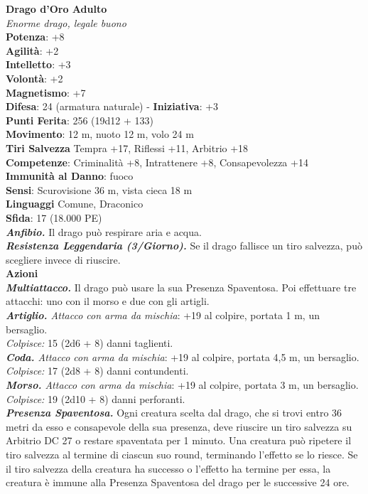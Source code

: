 \begin{multicols}{2}
\medskip\textbf{Drago d'Oro Adulto}\\
\emph{Enorme drago, legale buono}\\
\textbf{Potenza}: +8\\
\textbf{Agilità}: +2\\
\textbf{Intelletto}: +3\\
\textbf{Volontà}: +2\\
\textbf{Magnetismo}: +7\\
\textbf{Difesa}: 24 (armatura naturale) - \textbf{Iniziativa}: +3\\
\textbf{Punti Ferita}: 256 (19d12 + 133)\\
\textbf{Movimento}: 12 m, nuoto 12 m, volo 24 m\\
\textbf{Tiri Salvezza} Tempra +17, Riflessi +11, Arbitrio +18\\
\textbf{Competenze}: Criminalità +8, Intrattenere +8, Consapevolezza +14\\
\textbf{Immunità al Danno}: fuoco\\
\textbf{Sensi}: Scurovisione 36 m, vista cieca 18 m\\
\textbf{Linguaggi} Comune, Draconico\\
\textbf{Sfida}: 17 (18.000 PE)\smallskip\\
\emph{\textbf{Anfibio.}} Il drago può respirare aria e acqua.\\
\emph{\textbf{Resistenza Leggendaria (3/Giorno).}} Se il drago fallisce un tiro salvezza, può scegliere invece di riuscire.\\
\smallskip\textbf{Azioni}\\
\emph{\textbf{Multiattacco.}} Il drago può usare la sua Presenza Spaventosa. Poi effettuare tre attacchi: uno con il morso e due con gli artigli.\\
\emph{\textbf{Artiglio.} Attacco con arma da mischia}: +19 al colpire, portata 1 m, un bersaglio.\\
\emph{Colpisce:} 15 (2d6 + 8) danni taglienti.\\
\emph{\textbf{Coda.} Attacco con arma da mischia}: +19 al colpire, portata 4,5 m, un bersaglio.\\
\emph{Colpisce:} 17 (2d8 + 8) danni contundenti.\\
\emph{\textbf{Morso.} Attacco con arma da mischia}: +19 al colpire, portata 3 m, un bersaglio.\\
\emph{Colpisce:} 19 (2d10 + 8) danni perforanti.\\
\emph{\textbf{Presenza Spaventosa.}} Ogni creatura scelta dal drago, che si trovi entro 36 metri da esso e consapevole della sua presenza, deve riuscire un tiro salvezza su Arbitrio DC  27 o restare spaventata per 1 minuto. Una creatura può ripetere il tiro salvezza al termine di ciascun suo round, terminando l'effetto se lo riesce. Se il tiro salvezza della creatura ha successo o l'effetto ha termine per essa, la creatura è immune alla Presenza Spaventosa del drago per le successive 24 ore.\\

\end{multicols}
